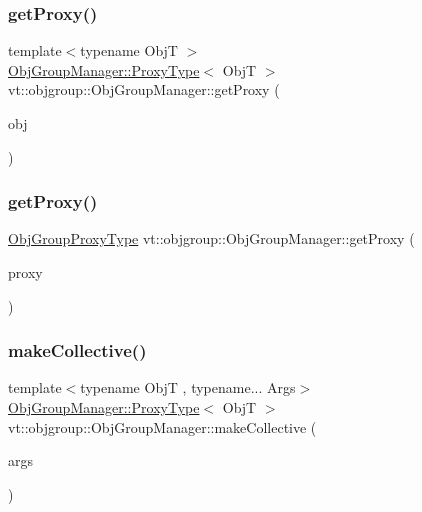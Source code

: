 \subsubsection{\texorpdfstring{get\+Proxy()}{getProxy()}\hspace{0.1cm}{\footnotesize\ttfamily [1/2]}}
{\footnotesize\ttfamily template$<$typename ObjT $>$ \\
\hyperlink{structvt_1_1objgroup_1_1_obj_group_manager_aea65eef52f240a52210132eef5ce591f}{Obj\+Group\+Manager\+::\+Proxy\+Type}$<$ ObjT $>$ vt\+::objgroup\+::\+Obj\+Group\+Manager\+::get\+Proxy (\begin{DoxyParamCaption}\item[{ObjT $\ast$}]{obj }\end{DoxyParamCaption})}

\mbox{\label{structvt_1_1objgroup_1_1_obj_group_manager_a9569c5ad1c032a90573bd987c64f560a}} 
\subsubsection{\texorpdfstring{get\+Proxy()}{getProxy()}\hspace{0.1cm}{\footnotesize\ttfamily [2/2]}}
{\footnotesize\ttfamily \hyperlink{namespacevt_ad7cae989df485fccca57f0792a880a8e}{Obj\+Group\+Proxy\+Type} vt\+::objgroup\+::\+Obj\+Group\+Manager\+::get\+Proxy (\begin{DoxyParamCaption}\item[{\hyperlink{namespacevt_ad7cae989df485fccca57f0792a880a8e}{Obj\+Group\+Proxy\+Type}}]{proxy }\end{DoxyParamCaption})}

\mbox{\label{structvt_1_1objgroup_1_1_obj_group_manager_a651c44a47c6bcdc9f1b6c9e857fa03f2}} 
\subsubsection{\texorpdfstring{make\+Collective()}{makeCollective()}\hspace{0.1cm}{\footnotesize\ttfamily [1/5]}}
{\footnotesize\ttfamily template$<$typename ObjT , typename... Args$>$ \\
\hyperlink{structvt_1_1objgroup_1_1_obj_group_manager_aea65eef52f240a52210132eef5ce591f}{Obj\+Group\+Manager\+::\+Proxy\+Type}$<$ ObjT $>$ vt\+::objgroup\+::\+Obj\+Group\+Manager\+::make\+Collective (\begin{DoxyParamCaption}\item[{Args \&\&...}]{args }\end{DoxyParamCaption})}

